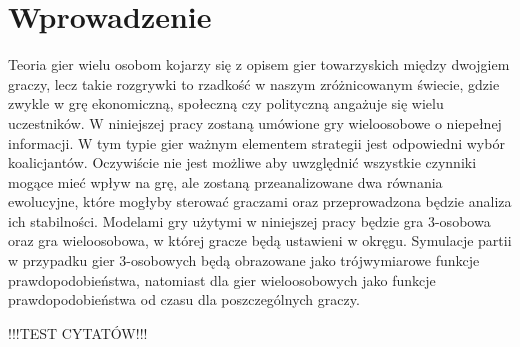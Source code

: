 \chapter{Wprowadzenie}
\label{cha:wprowadzenie}

Teoria gier wielu osobom kojarzy się z opisem gier towarzyskich między dwojgiem graczy, lecz takie rozgrywki to rzadkość w naszym zróżnicowanym świecie, gdzie zwykle w grę ekonomiczną, społeczną czy polityczną angażuje się wielu uczestników. W niniejszej pracy zostaną umówione gry wieloosobowe o niepełnej informacji. W tym typie gier ważnym elementem strategii jest odpowiedni wybór koalicjantów. Oczywiście nie jest możliwe aby uwzględnić wszystkie czynniki mogące mieć wpływ na grę, ale zostaną przeanalizowane dwa równania ewolucyjne, które mogłyby sterować graczami oraz przeprowadzona będzie analiza ich stabilności. Modelami gry użytymi w niniejszej pracy będzie gra 3-osobowa oraz gra wieloosobowa, w której gracze będą ustawieni w okręgu. Symulacje partii w przypadku gier 3-osobowych będą obrazowane jako trójwymiarowe funkcje prawdopodobieństwa, natomiast dla gier wieloosobowych jako funkcje prawdopodobieństwa od czasu dla poszczególnych graczy.


!!!TEST CYTATÓW!!! \cite{Now06} \cite{Hof98} \cite{Str01} \cite{Qt} \cite{Tut} \cite{Sza} \cite{Fsmd} \cite{Crf}